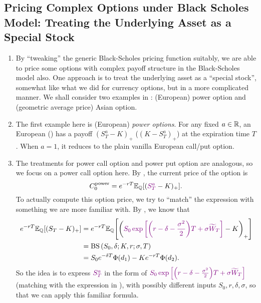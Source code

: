 \subsection{Pricing Complex Options under Black Scholes Model: Treating the Underlying Asset as a Special Stock}
\label{subsect:bs-special-stock}
\begin{enumerate}
\item By ``tweaking'' the generic Black-Scholes pricing function suitably, we
are able to price some options with complex payoff structure in the
Black-Scholes model also. One approach is to treat the underlying asset as a
``special stock'', somewhat like what we did for currency options, but in a
more complicated manner. We shall consider two examples in
: (European) power option and (geometric average
price) Asian option.

\item The first example here is (European) \emph{power options}. For any fixed
\(a\in\mathbb{R}\), an European  () has
a payoff \((S_T^{a}-K)_{+}\) (\((K-S_T^{a})_{+}\)) at the expiration time
\(T\). When \(a=1\), it reduces to the plain vanilla European call/put option.

\item The treatments for power call option and power put option are analogous,
so we focus on a power call option here. By ,
the current price of the option is
\[
C_0^{\mathrm{power}}=e^{-rT}\mathbb{E}_{\mathbb{Q}}\qty[({\color{violet}S_T^{a}}-K)_{+}].
\]
To actually compute this option price, we try to ``match'' the expression with
something we are more familiar with. By , we know
that
\begin{align*}
e^{-rT}\mathbb{E}_{\mathbb{Q}}\qty[(S_T-K)_{+}]
&=e^{-rT}\mathbb{E}_{\mathbb{Q}}\qty[\qty({\color{violet}S_0\exp\qty[\qty(r-\delta-\frac{\sigma^2}{2})T+\sigma\widetilde{W}_T]}-K)_{+}] \\
&=\operatorname{BS}\qty(S_0,\delta;K,r;\sigma,T) \\
&=S_0e^{-\delta T}\Phi(d_1)-Ke^{-rT}\Phi(d_2).
\end{align*}
So the idea is to express \({\color{violet}S_T^a}\) in the form of
\({\color{violet}S_0\exp\qty[\qty(r-\delta-\frac{\sigma^2}{2})T+\sigma\widetilde{W}_T]}\)
(matching with the expression in ), with possibly
different inputs \(S_0,r,\delta,\sigma\), so that we can apply this familiar
formula.


\end{enumerate}
